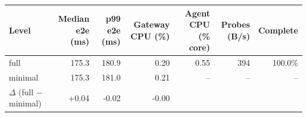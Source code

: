 \begin{tabular}{lrrrrrr}
\toprule
Level & Median e2e (ms) & p99 e2e (ms) & Gateway CPU (\%) & Agent CPU (\% core) & Probes (B/s) & Complete \\
\midrule
full & 175.3 & 180.9 & 0.20 & 0.55 & 394 & 100.0\% \\
minimal & 175.3 & 181.0 & 0.21 & -- & -- & -- \\
\midrule
$\Delta$ (full $-$ minimal) & +0.04 & -0.02 & -0.00 & & & \\
\bottomrule
\end{tabular}
